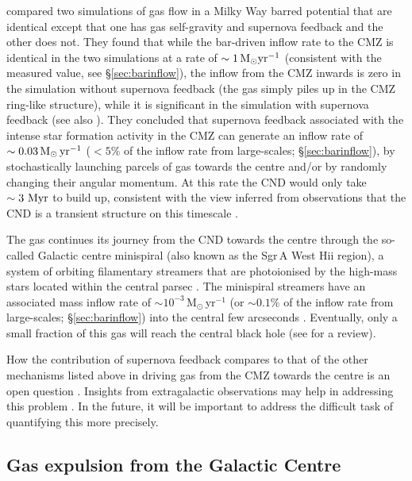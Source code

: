 \cite{Tress2020} compared two simulations of gas flow in a Milky Way barred potential that are identical except that one has gas self-gravity and supernova feedback and the other does not. They found that while the bar-driven inflow rate to the CMZ is identical in the two simulations at a rate of $\sim 1\, \mbox{M$_\odot$}\mbox{${\rm yr}$}^{-1}$ (consistent with the measured value, see \S\ref{sec:barinflow}), the inflow from the CMZ inwards is zero in the simulation without supernova feedback (the gas simply piles up in the CMZ ring-like structure), while it is significant in the simulation with supernova feedback (see also \citealt{Salas2020}). They concluded that supernova feedback associated with the intense star formation activity in the CMZ can generate an inflow rate of $\sim 0.03\,\mbox{M$_\odot$}\,\mbox{${\rm yr}$}^{-1}$ ($<5\%$ of the inflow rate from large-scales; \S\ref{sec:barinflow}), by stochastically launching parcels of gas towards the centre and/or by randomly changing their angular momentum. At this rate the CND would only take $\sim 3~\mbox{${\rm Myr}$}$ to build up, consistent with the view inferred from observations that the CND is a transient structure on this timescale \citep[][\S\ref{sec:cnd}]{Requena-Torres2012,Mapelli2016,Ballone2019,Dinh2021}. 

The gas continues its journey from the CND towards the centre through the so-called Galactic centre minispiral (also known as the Sgr\,A West H{\sc ii} region), a system of orbiting filamentary streamers that are photoionised by the high-mass stars located within the central parsec \citep{Lo1983, Ekers1983, Nitschai2020a, Heywood2022}. The minispiral streamers have an associated mass inflow rate of $\sim10^{-3}$\,M$_{\odot}$\,yr$^{-1}$ (or $\sim0.1\%$ of the inflow rate from large-scales; \S\ref{sec:barinflow}) into the central few arcseconds \citep{Jackson1993, Genzel1994}. Eventually, only a small fraction of this gas will reach the central black hole (see \citealt{Genzel2010} for a review).

How the contribution of supernova feedback compares to that of the other mechanisms listed above in driving gas from the CMZ towards the centre is an open question \citep{Combes2017b}. Insights from extragalactic observations may help in addressing this problem \citep{Garcia-Burillo2005,Hunt2008}. In the future, it will be important to address the difficult task of quantifying this more precisely.

\subsection{Gas expulsion from the Galactic Centre} 
\label{sec:feedback}

